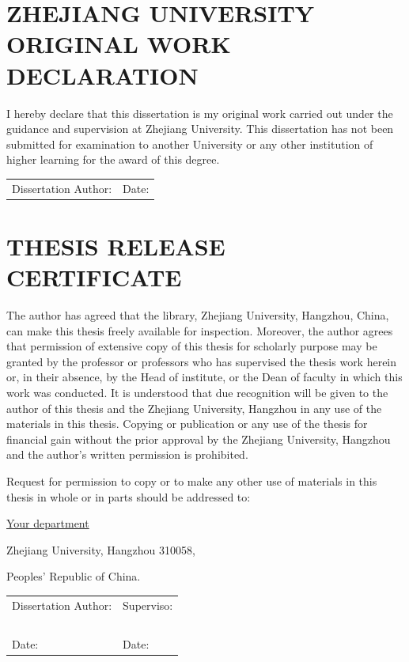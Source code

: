 \cleardoublepage
\chapter*{ZHEJIANG UNIVERSITY ORIGINAL WORK DECLARATION}
\thispagestyle{cover}

{

    \large

    I hereby declare that this dissertation is my original work carried out under the guidance and
    supervision at Zhejiang University. This dissertation has not been submitted for examination to
    another University or any other institution of higher learning for the award of this degree.

    \begin{center}
        \begin{tabularx}{\linewidth}{ X X }
            Dissertation Author: &
            Date:
        \end{tabularx}
    \end{center}

}

\chapter*{THESIS RELEASE CERTIFICATE}
\thispagestyle{cover}

{

    \large

    The author has agreed that the library, Zhejiang University, Hangzhou, China, can
    make this thesis freely available for inspection. Moreover, the author agrees that
    permission of extensive copy of this thesis for scholarly purpose may be granted by
    the professor or professors who has supervised the thesis work herein or, in their
    absence, by the Head of institute, or the Dean of faculty in which this work was
    conducted. It is understood that due recognition will be given to the author of this
    thesis and the Zhejiang University, Hangzhou in any use of the materials in this
    thesis. Copying or publication or any use of the thesis for financial gain without the
    prior approval by the Zhejiang University, Hangzhou and the author’s written
    permission is prohibited.

    Request for permission to copy or to make any other use of materials in this thesis in
    whole or in parts should be addressed to:

    \uline{Your department}

    Zhejiang University, Hangzhou 310058,

    Peoples' Republic of China.

    \begin{center}
        \begin{tabularx}{\linewidth}{ X X }
            Dissertation Author: &
            Superviso:               \\
            ~                    & ~ \\
            Date:                &
            Date:
        \end{tabularx}
    \end{center}

}